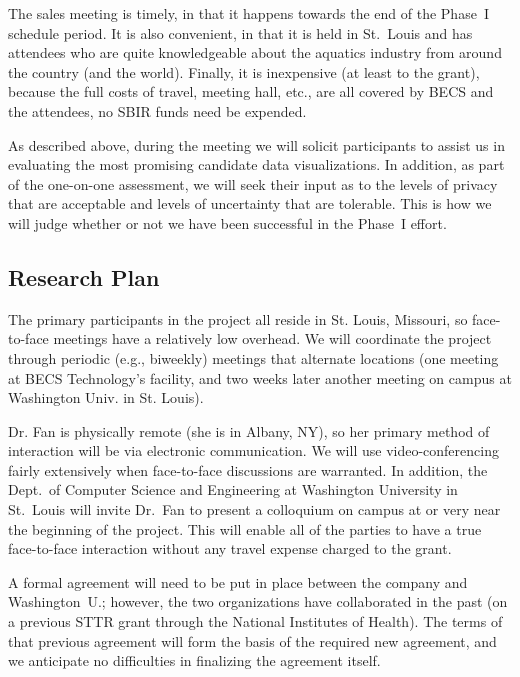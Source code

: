 The sales meeting is timely, in that it happens towards the end of
the Phase~I schedule period.  It is also convenient, in that it is held
in St.~Louis and has attendees who are quite knowledgeable about 
the aquatics industry from around the country (and the world).
Finally, it is inexpensive (at least to the grant), because the full
costs of travel, meeting hall, etc., are all covered by BECS and
the attendees, no SBIR funds need be expended.

As described above, during the meeting we will solicit participants
to assist us in evaluating the most promising candidate data visualizations.
In addition, as part of the one-on-one assessment, we will seek their
input as to the levels of privacy that are acceptable and levels of 
uncertainty that are tolerable.
This is how we will judge whether or not we have been successful
in the Phase~I effort.

\subsection{Research Plan}
\label{sec:plan}

The primary participants in the project all reside in St. Louis, Missouri,
so face-to-face meetings have a relatively low overhead. We will coordinate
the project through periodic (e.g., biweekly) meetings that alternate
locations (one meeting at BECS Technology's facility, and two weeks later
another meeting on campus at Washington Univ. in St. Louis).

Dr. Fan is physically remote (she is in Albany, NY), so her primary
method of interaction will be via electronic communication.  We will
use video-conferencing fairly extensively when face-to-face discussions
are warranted.  In addition, the Dept.~of Computer Science and Engineering
at Washington University in St.~Louis
will invite Dr.~Fan to present a colloquium on campus at or very near
the beginning of the project.  This will enable all of the parties to
have a true face-to-face interaction without any travel expense charged
to the grant.

A formal agreement will need to be put in place between the company and
Washington~U.; however, the two organizations have collaborated in the
past (on a previous STTR grant through the National Institutes of Health).
The terms of that previous agreement will form the
basis of the required new agreement, and we anticipate no difficulties
in finalizing the agreement itself.

